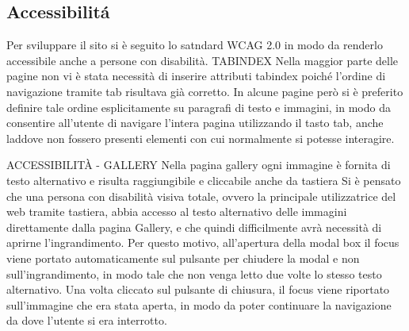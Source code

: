 	\subsection{Accessibilit\'a}
		Per sviluppare il sito si è seguito lo satndard WCAG 2.0 in modo da renderlo accessibile anche a persone con disabilità.
		TABINDEX
		Nella maggior parte delle pagine non vi è stata necessità di inserire attributi tabindex poiché l'ordine di navigazione tramite tab risultava già corretto.
		In alcune pagine però si è preferito definire tale ordine esplicitamente su paragrafi di testo e immagini, in modo da consentire all'utente di navigare l'intera pagina utilizzando il tasto tab, anche laddove non fossero presenti elementi con cui normalmente si potesse interagire.

		ACCESSIBILITÀ - GALLERY
		Nella pagina gallery ogni immagine è fornita di testo alternativo e risulta raggiungibile e cliccabile anche da tastiera
		Si è pensato che una persona con disabilità visiva totale, ovvero la principale utilizzatrice del web tramite tastiera, abbia accesso al testo alternativo delle immagini direttamente dalla pagina Gallery, e che quindi difficilmente avrà necessità di aprirne l'ingrandimento.
		Per questo motivo, all'apertura della modal box il focus viene portato automaticamente sul pulsante per chiudere la modal e non sull'ingrandimento, in modo tale che non venga letto due volte lo stesso testo alternativo.
		Una volta cliccato sul pulsante di chiusura, il focus viene riportato sull'immagine che era stata aperta, in modo da poter continuare la navigazione da dove l'utente si era interrotto. 

